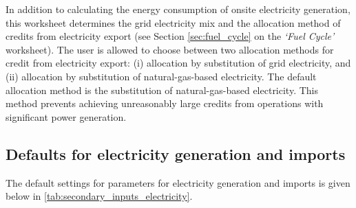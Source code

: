 \documentclass[11pt]{report}
\newcommand{\sheet}[1]{\textit{`{#1}'}}
\begin{document}
In addition to calculating the energy consumption of onsite electricity generation, this worksheet determines the grid electricity mix and the allocation method of credits from electricity export (see Section \ref{sec:fuel_cycle} on the \sheet{Fuel Cycle} worksheet). The user is allowed to choose between two allocation methods for credit from electricity export: (i) allocation by substitution of grid electricity, and (ii) allocation by substitution of natural-gas-based electricity. The default allocation method is the substitution of natural-gas-based electricity. This method prevents achieving unreasonably large credits from operations with significant power generation. 

\subsection{Defaults for electricity generation and imports}

The default settings for parameters for electricity generation and imports is given below in \ref{tab:secondary_inputs_electricity}.

\clearpage
\end{document}
